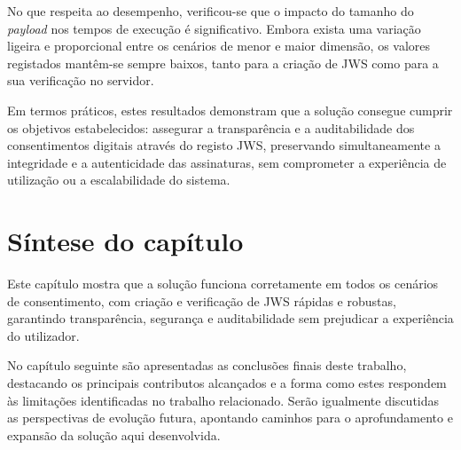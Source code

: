 No que respeita ao desempenho, verificou-se que o impacto do tamanho do \textit{payload} nos tempos de execução é significativo. Embora exista uma variação ligeira e proporcional entre os cenários de menor e maior dimensão, os valores registados mantêm-se sempre baixos, tanto para a criação de JWS como para a sua verificação no servidor.

Em termos práticos, estes resultados demonstram que a solução consegue cumprir os objetivos estabelecidos: assegurar a transparência e a auditabilidade dos consentimentos digitais através do registo JWS, preservando simultaneamente a integridade e a autenticidade das assinaturas, sem comprometer a experiência de utilização ou a escalabilidade do sistema.

\section {Síntese do capítulo}

Este capítulo mostra que a solução funciona corretamente em todos os cenários de consentimento, com criação e verificação de JWS rápidas e robustas, garantindo transparência, segurança e auditabilidade sem prejudicar a experiência do utilizador.

No capítulo seguinte são apresentadas as conclusões finais deste trabalho, destacando os principais contributos alcançados e a forma como estes respondem às limitações identificadas no trabalho relacionado. Serão igualmente discutidas as perspectivas de evolução futura, apontando caminhos para o aprofundamento e expansão da solução aqui desenvolvida.
